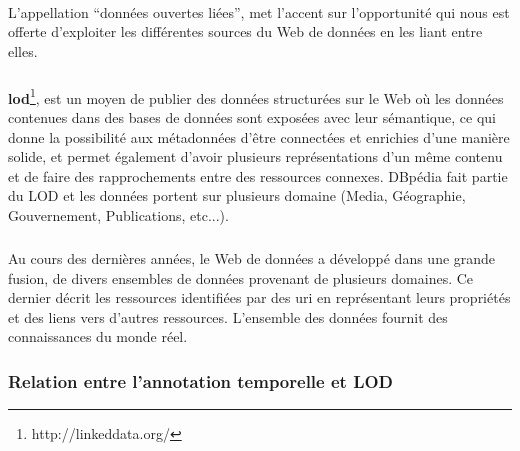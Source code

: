 \paragraph{}
L'appellation ``données ouvertes liées'', met l'accent sur l'opportunité qui nous est offerte d'exploiter les différentes sources du Web de données en les liant entre elles. 
\subparagraph{}
{\bf\gls{lod}}\footnote{http://linkeddata.org/}, est un moyen de publier des données structurées sur le Web où les données contenues dans des bases de données sont exposées avec leur sémantique, ce qui donne la possibilité aux métadonnées d'être connectées et enrichies d'une manière solide, et permet également d'avoir plusieurs représentations d'un même contenu et de faire des rapprochements entre des ressources connexes. DBpédia fait partie du LOD et les données portent sur plusieurs domaine (Media, Géographie, Gouvernement, Publications, etc...).
\subparagraph{}
Au cours des dernières années, le Web de données a développé dans une grande fusion, de divers ensembles de données provenant de plusieurs domaines. Ce dernier décrit les ressources identifiées par des \gls{uri} en représentant leurs propriétés et des liens vers d’autres ressources. L'ensemble des données fournit des connaissances du monde réel.
\subsubsection{Relation entre l'annotation temporelle et LOD}
